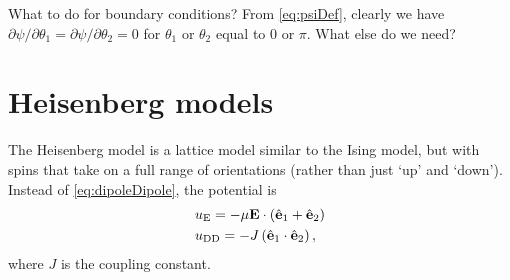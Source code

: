 \documentclass[11pt,reqno]{amsart}
\begin{document}
What to do for boundary conditions?  From \eqref{eq:psiDef}, clearly we have $\partial\psi/\partial\theta_1 = \partial\psi/\partial\theta_2 = 0$ for $\theta_1$ or $\theta_2$ equal to 0 or $\pi$.  What else do we need?

\section{Heisenberg models}
The Heisenberg model is a lattice model similar to the Ising model, but with spins that take on a full range of orientations (rather than just `up' and `down'). Instead of \eqref{eq:dipoleDipole}, the potential is
\begin{subequations}
\label{eq:Heisenberg}
\begin{align}
&u_{\rm E}=-\mu {\bf E}\cdot \left({\hat {\bf e}}_{1}+ {\hat {\bf e}}_2 \right) \\ 
&u_{\rm DD}= -J\left({\hat {\bf e}}_{1}\cdot{\hat {\bf e}}_{2}\right),
\end{align}
\end{subequations}
where $J$ is the coupling constant.
\end{document}
